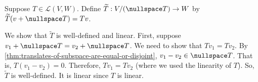 \documentclass{article}
\begin{document}
\begin{definition}[$\widetilde{T}$]
  \label{def:widetilde-T}
  Suppose $T \in \mathcal{L}(V, W)$. Define $\widetilde{T}:
  V/(\nullspace T) \rightarrow W$ by $\widetilde{T}(v + \nullspace T)
  = Tv$.
\end{definition}

\begin{remark}
  We show that $\widetilde{T}$ is well-defined and linear. First,
  suppose $v_1 + \nullspace T = v_2 + \nullspace T$. We need to show
  that $Tv_1 = Tv_2$. By
  \cref{thm:translates-of-subspace-are-equal-or-disjoint}, $v_1 - v_2
  \in \nullspace T$. That is, $T(v_1 - v_2) = 0$. Therefore, $Tv_1 =
  Tv_2$ (where we used the linearity of $T$). So, $\widetilde{T}$ is
  well-defined. It is linear since $T$ is linear. 
\end{remark}
\end{document}
